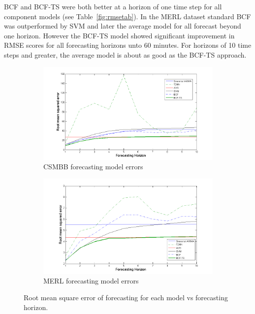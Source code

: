 \documentclass{acm_proc_article-sp}
\begin{document}
BCF and BCF-TS were both better at a horizon of one time step for all component models (see Table~\ref{fig:rmsetab}).  In the MERL dataset standard BCF was outperformed by SVM and later the average model for all forecast beyond one horizon.  However the BCF-TS model showed significant improvement in RMSE scores for all forecasting horizons unto 60 minutes.  For horizons of 10 time steps and greater, the average model is about as good as the BCF-TS approach.

\begin{figure}
\centering
\begin{subfigure}{.49\textwidth}
  \centering
  \includegraphics[width=1.0\linewidth]{brown_rmse.png}
  \caption{CSMBB forecasting model errors}
  \label{fig:csmrmse}
\end{subfigure}
\begin{subfigure}{.49\textwidth}
  \centering
  \includegraphics[width=1.0\linewidth]{merl_rmse.png}
  \caption{MERL forecasting model errors}
  \label{fig:merlrmse}
\end{subfigure}
\caption{Root mean square error of forecasting for each model vs forecasting horizon.}
\label{fig:rmseplot}
\end{figure}
\end{document}
